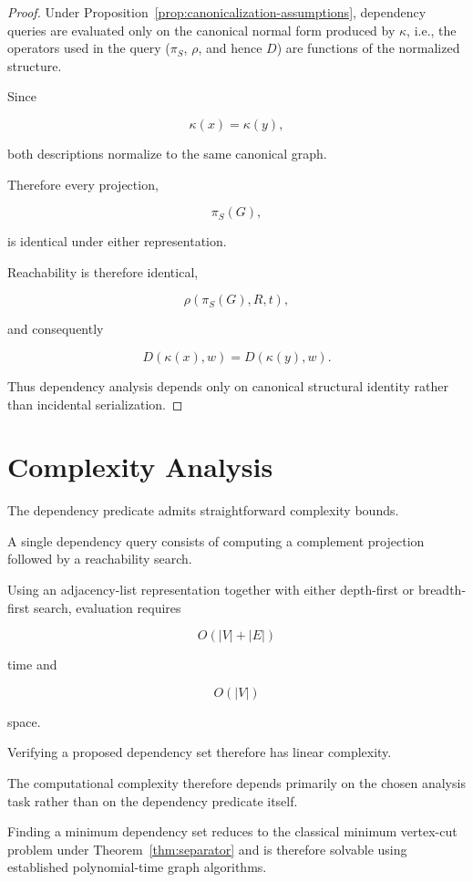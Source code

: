\documentclass[11pt]{article}
\begin{document}
\begin{proof}
Under Proposition~\ref{prop:canonicalization-assumptions}, dependency queries are evaluated only on the canonical normal
form produced by $\kappa$, i.e., the operators used in the query
($\pi_S$, $\rho$, and hence $D$) are functions of the normalized structure.

Since

\[
\kappa(x)=\kappa(y),
\]

both descriptions normalize to the same canonical graph.

Therefore every projection,

\[
\pi_S(G),
\]

is identical under either representation.

Reachability is therefore identical,

\[
\rho(\pi_S(G),R,t),
\]

and consequently

\[
D(\kappa(x),w)
=
D(\kappa(y),w).
\]

Thus dependency analysis depends only on canonical structural
identity rather than incidental serialization.

\end{proof}
\section{Complexity Analysis}

The dependency predicate admits straightforward complexity bounds.

A single dependency query consists of computing a complement projection
followed by a reachability search.

Using an adjacency-list representation together with either depth-first
or breadth-first search, evaluation requires

\[
O(|V|+|E|)
\]

time and

\[
O(|V|)
\]

space.

Verifying a proposed dependency set therefore has linear complexity.

The computational complexity therefore depends primarily on the chosen analysis task rather than on the dependency predicate itself.

Finding a minimum dependency set reduces to the classical minimum
vertex-cut problem under Theorem~\ref{thm:separator} and is therefore
solvable using established polynomial-time graph algorithms.
\end{document}
